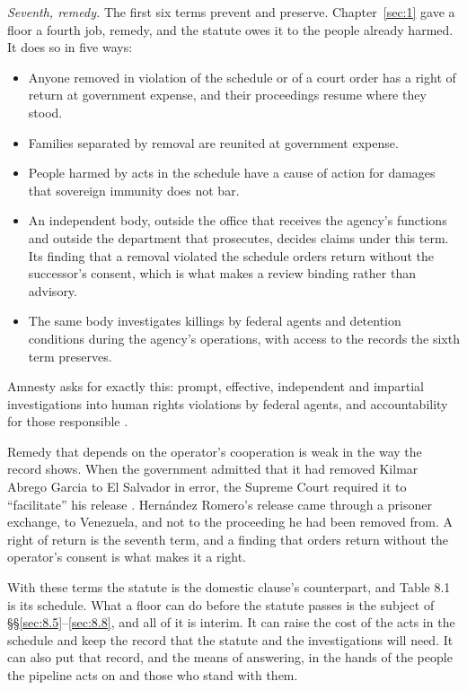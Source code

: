 \emph{Seventh, remedy.} The first six terms prevent and preserve. Chapter~\ref{sec:1} gave a floor a fourth job, remedy, and the statute owes it to the people already harmed. It does so in five ways:

\begin{itemize}
\item Anyone removed in violation of the schedule or of a court order has a right of return at government expense, and their proceedings resume where they stood.
\item Families separated by removal are reunited at government expense.
\item People harmed by acts in the schedule have a cause of action for damages that sovereign immunity does not bar.
\item An independent body, outside the office that receives the agency's functions and outside the department that prosecutes, decides claims under this term. Its finding that a removal violated the schedule orders return without the successor's consent, which is what makes a review binding rather than advisory.
\item The same body investigates killings by federal agents and detention conditions during the agency's operations, with access to the records the sixth term preserves.
\end{itemize}

Amnesty asks for exactly this: prompt, effective, independent and impartial investigations into human rights violations by federal agents, and accountability for those responsible \autocite{Amnesty2026Whistles}.

Remedy that depends on the operator's cooperation is weak in the way the record shows. When the government admitted that it had removed Kilmar Abrego Garcia to El Salvador in error, the Supreme Court required it to “facilitate” his release \autocite{abregogarcia2025}. Hernández Romero's release came through a prisoner exchange, to Venezuela, and not to the proceeding he had been removed from. A right of return is the seventh term, and a finding that orders return without the operator's consent is what makes it a right.

With these terms the statute is the domestic clause's counterpart, and Table 8.1 is its schedule. What a floor can do before the statute passes is the subject of \S\S\ref{sec:8.5}–\ref{sec:8.8}, and all of it is interim. It can raise the cost of the acts in the schedule and keep the record that the statute and the investigations will need. It can also put that record, and the means of answering, in the hands of the people the pipeline acts on and those who stand with them.
